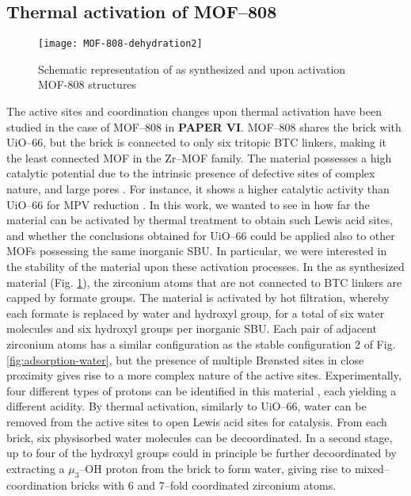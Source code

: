 \subsection*{Thermal activation of MOF--808}
\begin{figure}[!htbp]
	\centering
	\texttt{[image: MOF-808-dehydration2]}
	\caption{Schematic representation of as synthesized and upon activation MOF-808 structures}
	\label{fig:MOF-808-dehydration2}
\end{figure}
The active sites and coordination changes upon thermal activation have been studied in the case of MOF--808 in \textbf{PAPER VI}. MOF--808 shares the  brick with UiO--66, but the brick is connected to only six tritopic BTC linkers, making it the least connected MOF in the Zr--MOF family. The material possesses a high catalytic potential due to the intrinsic presence of defective sites of complex nature, and large pores \cite{furukawa2014water}. For instance, it shows a higher catalytic activity than UiO--66 for MPV reduction \cite{plessers2016zr, mautschke2018catalytic}.
\npar
In this work, we wanted to see in how far the material can be activated by thermal treatment to obtain such Lewis acid sites, and whether the conclusions obtained for UiO--66 could be applied also to other MOFs possessing the same inorganic SBU. In particular, we were interested in the stability of the material upon these activation processes.
\npar
In the as synthesized material (Fig. \ref{fig:MOF-808-dehydration2}), the zirconium atoms that are not connected to BTC linkers are capped by formate groups. The material is activated by hot filtration, whereby each formate is replaced by water and hydroxyl group, for a total of six water molecules and six hydroxyl groups per inorganic SBU\cite{plessers2016zr, mautschke2018catalytic}. Each pair of adjacent zirconium atoms has a similar configuration as the stable configuration 2 of Fig. \ref{fig:adsorption-water}, but the presence of multiple Br\o{}nsted sites in close proximity gives rise to a more complex nature of the active sites. Experimentally, four different types of protons can be identified in this material \cite{klet2016evaluation}, each yielding a different acidity. 
\npar
By thermal activation, similarly to UiO--66, water can be removed from the active sites to open Lewis acid sites for catalysis. From each brick, six physisorbed water molecules can be decoordinated. In a second stage, up to four of the hydroxyl groups could in principle be further decoordinated by extracting a $\mu_3$--OH proton from the brick to form water, giving rise to mixed--coordination bricks with 6 and 7--fold coordinated zirconium atoms.
